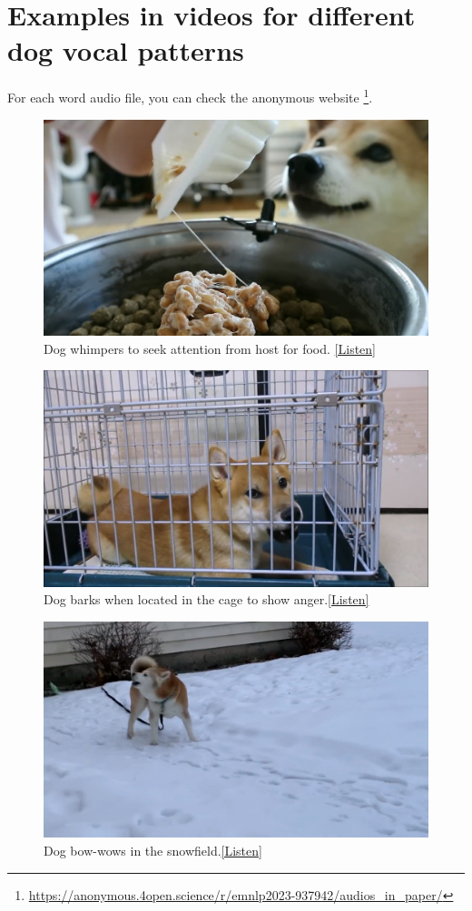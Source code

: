\section{Examples in videos for different dog vocal patterns}
For each word audio file, you can check the anonymous website \footnote{\url{https://anonymous.4open.science/r/emnlp2023-937942/audios_in_paper/}}.
\begin{figure}[ht]
        \centering
        \includegraphics[width=0.6\columnwidth]{images/whimper_attention.png}
        \caption{Dog whimpers to seek attention from host for food. \href{https://anonymous.4open.science/r/emnlp2023-937942/audios_in_paper/whimper-food.wav}{[Listen]}}
        \label{fig:whimper_attention}
\end{figure}

\begin{figure}[ht]
        \centering
        \includegraphics[width=0.6\columnwidth]{images/bark_cage.png}
        \caption{Dog barks when located in the cage to show anger.\href{https://anonymous.4open.science/r/emnlp2023-937942/audios_in_paper/bark-cage.wav}{[Listen]}}
        \label{fig:bark_cage}
\end{figure}

\begin{figure}[ht]
        \centering
        \includegraphics[width=0.6\columnwidth]{images/bow-wow_snowfield.png}
        \caption{Dog bow-wows in the snowfield.\href{https://anonymous.4open.science/r/emnlp2023-937942/audios_in_paper/bowwow-snowfield.wav}{[Listen]}}
        \label{fig:bow-wow_snowfield}
\end{figure}

